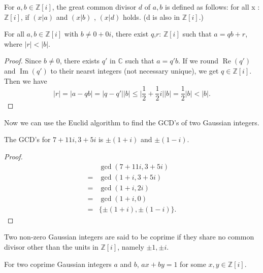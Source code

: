 \documentclass{article}
\begin{document}
\begin{definition}
For $a,b \in \mathbb{Z}[i]$, the great common divisor $d$ of $a, b$ is defined as follows:
for all x : $\mathbb{Z}[i]$, if $(x | a)$ and $(x | b)$ , $(x | d)$ holds. (d is also in $\mathbb{Z}[i]$.)
\end{definition}

\begin{theorem}
For all $a,b \in \mathbb{Z}[i]$ with $b \not = 0 + 0i$, there exist $q$,$r$: $\mathbb{Z}[i]$  such that $a = qb+r$, where $\vert r \vert < \vert b \vert.$
\end{theorem}

\begin{proof}
Since $b \not = 0$, there exists $q'$ in  $\mathbb{C}$ such that $a = q'b$. If we round $\operatorname{Re}(q')$ and $\operatorname{Im}(q')$ to their nearst integers (not necessary unique), we get $q \in \mathbb{Z}[i]$. Then we have 
$$\vert r \vert = \vert a - qb \vert  = \vert q - q' \vert \vert b \vert \leq \vert \frac{1}{2}+\frac{1}{2}i\vert\vert b\vert = \frac{1}{2}\vert b \vert < \vert b \vert.$$
\end{proof}

Now we can use the Euclid algorithm to find the GCD's of two Gaussian integers.

\begin{example}
The GCD's for $7+11i, 3+5i$ is $\pm (1+i)$ and $\pm (1-i)$. 
\end{example}

\begin{proof}
$$
\begin{aligned} & \gcd (7+11 i, 3+5 i) \\=& \operatorname{gcd}(1+i, 3+5 i) \\=& \operatorname{gcd}(1+i, 2 i)  \\ =&\operatorname{gcd}(1+i, 0) \\ =&\{\pm(1+i),\pm (1-i)\}. \end{aligned}$$
\end{proof}

\begin{definition}
Two non-zero Gaussian integers are said to be coprime if they share no common divisor other than the units in $\mathbb{Z}[i]$, namely $\pm 1, \pm i$.
\end{definition}

\begin{theorem}
For two coprime Gaussian integers $a$ and $b$, $ax+by = 1$ for some $x,y\in \mathbb{Z}[i].$
\end{theorem}
\end{document}
